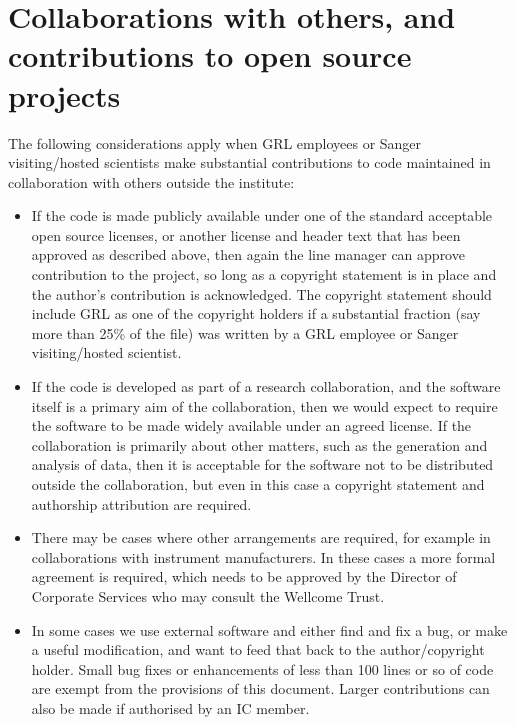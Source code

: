 \documentclass[10pt,a4paper]{article}
\begin{document}
\section{Collaborations with others, and contributions to open source projects}

The following considerations apply when GRL employees or Sanger visiting/hosted 
scientists make substantial contributions to code maintained in collaboration with 
others outside the institute: 

\begin{itemize}
\item If the code is made publicly available under one of the standard acceptable open 
source licenses, or another license and header text that has been approved as 
described above, then again the line manager can approve contribution to the 
project, so long as a copyright statement is in place and the author's contribution 
is acknowledged. The copyright statement should include GRL as one of the 
copyright holders if a substantial fraction (say more than 25\% of the file) was 
written by a GRL employee or Sanger visiting/hosted scientist. 
\item If the code is developed as part of a research collaboration, and the software itself 
is a primary aim of the collaboration, then we would expect to require the 
software to be made widely available under an agreed license. If the 
collaboration is primarily about other matters, such as the generation and 
analysis of data, then it is acceptable for the software not to be distributed 
outside the collaboration, but even in this case a copyright statement and 
authorship attribution are required.
\item There may be cases where other arrangements are required, for example in 
collaborations with instrument manufacturers. In these cases a more formal 
agreement is required, which needs to be approved by the Director of Corporate 
Services who may consult the Wellcome Trust.
\item In some cases we use external software and either find and fix a bug, or make a 
useful modification, and want to feed that back to the author/copyright holder. 
Small bug fixes or enhancements of less than 100 lines or so of code are exempt 
from the provisions of this document. Larger contributions can also be made if 
authorised by an IC member. 
\end{itemize}


\end{document}
